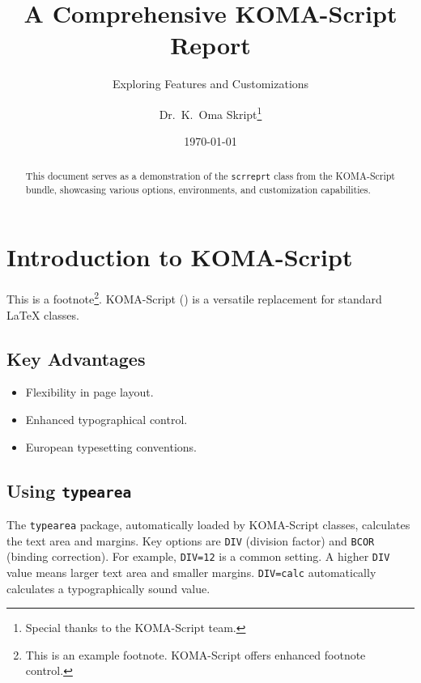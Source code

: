 \documentclass[
  a4paper,            %
  11pt,               %
  DIV=12,             %
  BCOR=5mm,           %
  twoside,            %
  headings=normal,    %
  toc=bibliography,   %
  toc=listof,         %
  listof=totoc,       %
  parskip=half,       %
  captions=tableheading, %
  numbers=autoendperiod, %
  appendixprefix=true,%
  chapterprefix=true, %
]{scrreprt}
\title{A Comprehensive KOMA-Script Report}
\subtitle{Exploring Features and Customizations}
\author{Dr.\ K.\ Oma Skript\thanks{Special thanks to the KOMA-Script team.}}
\date{\today}
\begin{document}
\maketitle

\begin{abstract}
  \lipsum[1] %
  This document serves as a demonstration of the \texttt{scrreprt} class from the KOMA-Script bundle, showcasing various options, environments, and customization capabilities.
\end{abstract}
\clearpage %

\tableofcontents
\listoftables
\lstlistoflistings%
\clearpage

\setcounter{page}{1}  %

\chapter{Introduction to KOMA-Script}
\lipsum[2-3]
This is a  footnote\footnote{This is an example footnote. KOMA-Script offers enhanced footnote control.}.
KOMA-Script (\KOMAScript) is a versatile replacement for standard LaTeX classes.

\section{Key Advantages}
\lipsum[4]
\begin{itemize}
  \item Flexibility in page layout.
  \item Enhanced typographical control.
  \item European typesetting conventions.
\end{itemize}

\section{Using \texttt{typearea}}
The \texttt{typearea} package, automatically loaded by KOMA-Script classes, calculates the text area and margins.
Key options are \texttt{DIV} (division factor) and \texttt{BCOR} (binding correction).
For example, \texttt{DIV=12} is a common setting. A higher \texttt{DIV} value means larger text area and smaller margins.
\texttt{DIV=calc} automatically calculates a typographically sound value.
\lipsum[5]
\end{document}
